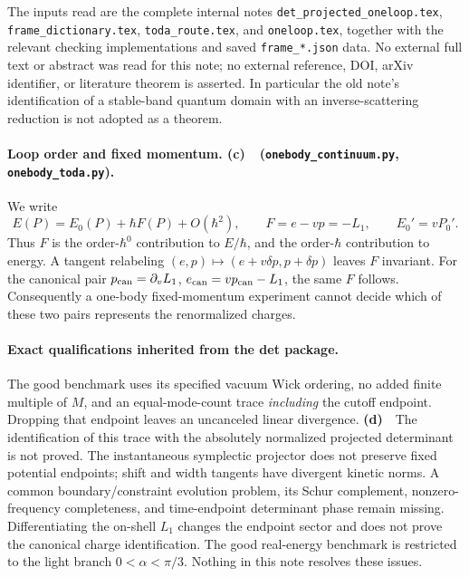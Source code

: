 \documentclass[11pt,a4paper]{article}
\newcommand{\Lc}{\textbf{(c)}\ }
\newcommand{\Ld}{\textbf{(d)}\ }
\newcommand{\CC}{\texttt{onebody\_\allowbreak continuum.py}}
\newcommand{\TT}{\texttt{onebody\_\allowbreak toda.py}}
\begin{document}
The inputs read are the complete internal notes
\texttt{det\_\allowbreak projected\_\allowbreak oneloop.tex},
\texttt{frame\_\allowbreak dictionary.tex},
\texttt{toda\_route.tex}, and \texttt{oneloop.tex}, together with the
relevant checking implementations and saved \texttt{frame\_*.json} data.
No external full text or abstract was read for this note; no external
reference, DOI, arXiv identifier, or literature theorem is asserted.
In particular the old note's identification of a stable-band quantum domain
with an inverse-scattering reduction is not adopted as a theorem.

\paragraph{Loop order and fixed momentum. \Lc\ (\CC, \TT).}
We write
\begin{equation}
 E(P)=E_0(P)+\hbar F(P)+O(\hbar^2),\qquad
 F=e-vp=-L_1,\qquad E_0'=vP_0'. \label{eq:invariant}
\end{equation}
Thus $F$ is the order-$\hbar^0$ contribution to $E/\hbar$, and the
order-$\hbar$ contribution to energy. A tangent relabeling
$(e,p)\mapsto(e+v\delta p,p+\delta p)$ leaves $F$ invariant.
For the canonical pair $p_{\rm can}=\partial_v L_1$,
$e_{\rm can}=vp_{\rm can}-L_1$, the same $F$ follows.
Consequently a one-body fixed-momentum experiment cannot decide which of
these two pairs represents the renormalized charges.

\paragraph{Exact qualifications inherited from the det package.}
The good benchmark uses its specified vacuum Wick ordering, no added finite
multiple of $M$, and an equal-mode-count trace \emph{including} the cutoff
endpoint. Dropping that endpoint leaves an uncanceled linear divergence.
\Ld\ The identification of this trace with the absolutely normalized
projected determinant is not proved. The instantaneous symplectic projector
does not preserve fixed potential endpoints; shift and width tangents have
divergent kinetic norms. A common boundary/constraint evolution problem,
its Schur complement, nonzero-frequency completeness, and time-endpoint
determinant phase remain missing. Differentiating the on-shell $L_1$ changes
the endpoint sector and does not prove the canonical charge identification.
The good real-energy benchmark is restricted to the light branch
$0<\alpha<\pi/3$. Nothing in this note resolves these issues.
\end{document}

